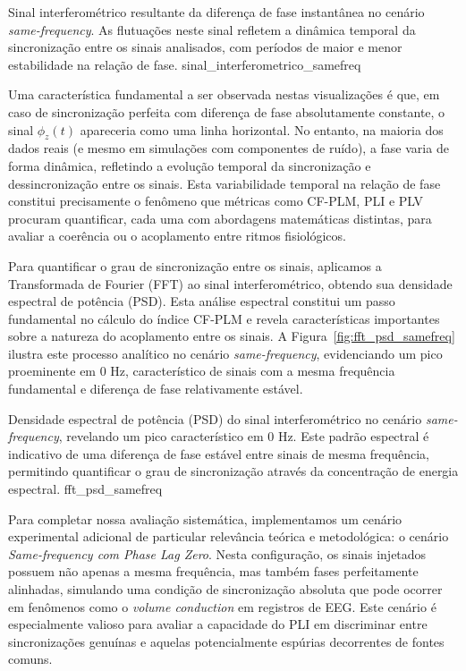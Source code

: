 {Sinal interferométrico resultante da diferença de fase instantânea no cenário \textit{same-frequency}. As flutuações neste sinal refletem a dinâmica temporal da sincronização entre os sinais analisados, com períodos de maior e menor estabilidade na relação de fase.}
{sinal_interferometrico_samefreq}

Uma característica fundamental a ser observada nestas visualizações é que, em caso de sincronização perfeita com diferença de fase absolutamente constante, o sinal \(\phi_z(t)\) apareceria como uma linha horizontal. No entanto, na maioria dos dados reais (e mesmo em simulações com componentes de ruído), a fase varia de forma dinâmica, refletindo a evolução temporal da sincronização e dessincronização entre os sinais. Esta variabilidade temporal na relação de fase constitui precisamente o fenômeno que métricas como CF-PLM, PLI e PLV procuram quantificar, cada uma com abordagens matemáticas distintas, para avaliar a coerência ou o acoplamento entre ritmos fisiológicos.

Para quantificar o grau de sincronização entre os sinais, aplicamos a Transformada de Fourier (FFT) ao sinal interferométrico, obtendo sua densidade espectral de potência (PSD). Esta análise espectral constitui um passo fundamental no cálculo do índice CF-PLM e revela características importantes sobre a natureza do acoplamento entre os sinais. A Figura~\ref{fig:fft_psd_samefreq} ilustra este processo analítico no cenário \textit{same-frequency}, evidenciando um pico proeminente em 0 Hz, característico de sinais com a mesma frequência fundamental e diferença de fase relativamente estável.

{Densidade espectral de potência (PSD) do sinal interferométrico no cenário \textit{same-frequency}, revelando um pico característico em 0 Hz. Este padrão espectral é indicativo de uma diferença de fase estável entre sinais de mesma frequência, permitindo quantificar o grau de sincronização através da concentração de energia espectral.}
{fft_psd_samefreq}

Para completar nossa avaliação sistemática, implementamos um cenário experimental adicional de particular relevância teórica e metodológica: o cenário \textit{Same-frequency com Phase Lag Zero}. Nesta configuração, os sinais injetados possuem não apenas a mesma frequência, mas também fases perfeitamente alinhadas, simulando uma condição de sincronização absoluta que pode ocorrer em fenômenos como o \textit{volume conduction} em registros de EEG. Este cenário é especialmente valioso para avaliar a capacidade do PLI em discriminar entre sincronizações genuínas e aquelas potencialmente espúrias decorrentes de fontes comuns.

